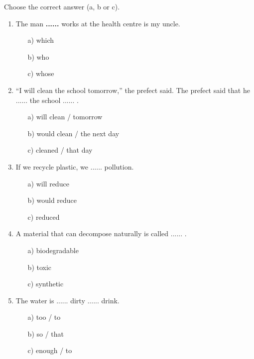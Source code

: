 \documentclass[11pt]{article}
\begin{document}
\begin{exercice}
Choose the correct answer (a, b or c).

\begin{enumerate}
\item The man \textbf{......} works at the health centre is my uncle.
\begin{itemize}
\item[a)] which \item[b)] who \item[c)] whose
\end{itemize}
\item ``I will clean the school tomorrow,'' the prefect said. The prefect said that he ...... the school ...... .
\begin{itemize}
\item[a)] will clean / tomorrow \item[b)] would clean / the next day \item[c)] cleaned / that day
\end{itemize}
\item If we recycle plastic, we ...... pollution.
\begin{itemize}
\item[a)] will reduce \item[b)] would reduce \item[c)] reduced
\end{itemize}
\item A material that can decompose naturally is called ...... .
\begin{itemize}
\item[a)] biodegradable \item[b)] toxic \item[c)] synthetic
\end{itemize}
\item The water is ...... dirty ...... drink.
\begin{itemize}
\item[a)] too / to \item[b)] so / that \item[c)] enough / to
\end{itemize}
\end{enumerate}
\end{exercice}
\end{document}
